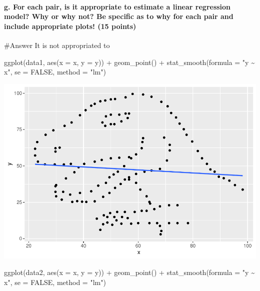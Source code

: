 \documentclass[
]{article}
\newenvironment{Shaded}{\begin{snugshade}}{\end{snugshade}}
\newcommand{\AttributeTok}[1]{\textcolor[rgb]{0.77,0.63,0.00}{#1}}
\newcommand{\ConstantTok}[1]{\textcolor[rgb]{0.00,0.00,0.00}{#1}}
\newcommand{\FunctionTok}[1]{\textcolor[rgb]{0.00,0.00,0.00}{#1}}
\newcommand{\NormalTok}[1]{#1}
\newcommand{\SpecialCharTok}[1]{\textcolor[rgb]{0.00,0.00,0.00}{#1}}
\newcommand{\StringTok}[1]{\textcolor[rgb]{0.31,0.60,0.02}{#1}}
\begin{document}
\hypertarget{g.-for-each-pair-is-it-appropriate-to-estimate-a-linear-regression-model-why-or-why-not-be-specific-as-to-why-for-each-pair-and-include-appropriate-plots-15-points}{%
\paragraph{g. For each pair, is it appropriate to estimate a linear
regression model? Why or why not? Be specific as to why for each pair
and include appropriate plots! (15
points)}\label{g.-for-each-pair-is-it-appropriate-to-estimate-a-linear-regression-model-why-or-why-not-be-specific-as-to-why-for-each-pair-and-include-appropriate-plots-15-points}}

\#Answer It is not appropriated to

\begin{Shaded}
\begin{Highlighting}[]
\FunctionTok{ggplot}\NormalTok{(data1, }\FunctionTok{aes}\NormalTok{(}\AttributeTok{x =}\NormalTok{ x, }\AttributeTok{y =}\NormalTok{ y)) }\SpecialCharTok{+}
  \FunctionTok{geom\_point}\NormalTok{() }\SpecialCharTok{+}
  \FunctionTok{stat\_smooth}\NormalTok{(}\AttributeTok{formula =} \StringTok{"y \textasciitilde{} x"}\NormalTok{, }\AttributeTok{se =} \ConstantTok{FALSE}\NormalTok{, }\AttributeTok{method =} \StringTok{"lm"}\NormalTok{)}
\end{Highlighting}
\end{Shaded}

\includegraphics{Final_Exam_Answers_in_Progress_files/figure-latex/unnamed-chunk-11-1.pdf}

\begin{Shaded}
\begin{Highlighting}[]
\FunctionTok{ggplot}\NormalTok{(data2, }\FunctionTok{aes}\NormalTok{(}\AttributeTok{x =}\NormalTok{ x, }\AttributeTok{y =}\NormalTok{ y)) }\SpecialCharTok{+}
  \FunctionTok{geom\_point}\NormalTok{() }\SpecialCharTok{+}
  \FunctionTok{stat\_smooth}\NormalTok{(}\AttributeTok{formula =} \StringTok{"y \textasciitilde{} x"}\NormalTok{, }\AttributeTok{se =} \ConstantTok{FALSE}\NormalTok{, }\AttributeTok{method =} \StringTok{"lm"}\NormalTok{)}
\end{Highlighting}
\end{Shaded}
\end{document}
